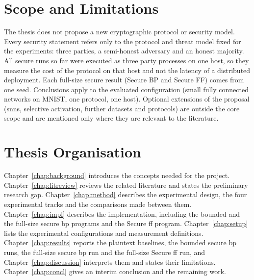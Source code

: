 \section{Scope and Limitations}\label{sec:intro-scope}
The thesis does not propose a new cryptographic protocol or security model. Every security statement refers only to the protocol and threat model fixed for the experiments: three parties, a semi-honest adversary and an honest majority. All secure runs so far were executed as three party processes on one host, so they measure the cost of the protocol on that host and not the latency of a distributed deployment. Each full-size secure result (Secure BP and Secure FF) comes from one seed. Conclusions apply to the evaluated configuration (small fully connected networks on MNIST, one protocol, one host). Optional extensions of the proposal (\acp{snn}, selective activation, further datasets and protocols) are outside the core scope and are mentioned only where they are relevant to the literature.

\section{Thesis Organisation}\label{sec:intro-org}
Chapter~\ref{chap:background} introduces the concepts needed for the project. Chapter~\ref{chap:litreview} reviews the related literature and states the preliminary research gap. Chapter~\ref{chap:method} describes the experimental design, the four experimental tracks and the comparisons made between them. Chapter~\ref{chap:impl} describes the implementation, including the bounded and the full-size secure \ac{bp} programs and the Secure \ac{ff} program. Chapter~\ref{chap:setup} lists the experimental configurations and measurement definitions. Chapter~\ref{chap:results} reports the plaintext baselines, the bounded secure \ac{bp} runs, the full-size secure \ac{bp} run and the full-size Secure \ac{ff} run, and Chapter~\ref{chap:discussion} interprets them and states their limitations. Chapter~\ref{chap:concl} gives an interim conclusion and the remaining work.
